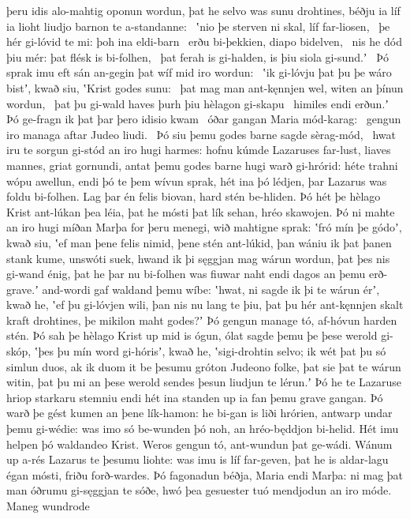 þeru idis alo-mahtig oponun wordun,
þat he selvo was sunu drohtines,
béðju ia líf ia lioht liudjo barnon
te a-standanne: \hld\ ʽnio þe sterven ni skal,
líf far-liosen, \hld\ þe hér gi-lóvid te mi:
þoh ina eldi-barn \hld\ erðu bi-þekkien,
diapo bidelven, \hld\ nis he dód þiu mér:
þat flésk is bi-folhen, \hld\ þat ferah is gi-halden,
is þiu siola gi-sund.ʼ \hld\ Þó sprak imu eft sán an-gegin
þat wíf mid iro wordun: \hld\ ʽik gi-lóvju þat þu þe wáro bistʼ, kwað siu,
ʽKrist godes sunu: \hld\ þat mag man ant-kęnnjen wel,
witen an þínun wordun, \hld\ þat þu gi-wald haves
þurh þiu hèlagon gi-skapu \hld\ himiles endi erðun.ʼ
Þó ge-fragn ik þat þar þero idisio kwam \hld\ óðar gangan
Maria mód-karag: \hld\ gengun iro managa aftar
Judeo liudi. \hld\ Þó siu þemu godes barne
sagde sèrag-mód, \hld\ hwat iru te sorgun gi-stód
an iro hugi harmes: hofnu kúmde
Lazaruses far-lust, liaves mannes,
griat gornundi, antat þemu godes barne
hugi warð gi-hrórid: héte trahni
wópu awellun, endi þó te þem wívun sprak,
hét ina þó lédjen, þar Lazarus was
foldu bi-folhen. Lag þar én felis biovan,
hard stén be-hliden. Þó hét þe hèlago Krist
ant-lúkan þea léia, þat he mósti þat lík sehan,
hréo skawojen. Þó ni mahte an iro hugi míðan
Marþa for þeru menegi, wið mahtigne sprak:
ʽfró mín þe gódoʼ, kwað siu, ʽef man þene felis nimid,
þene stén ant-lúkid, þan wániu ik þat þanen stank kume,
unswóti suek, hwand ik þi sęggjan mag
wárun wordun, þat þes nis gi-wand énig,
þat he þar nu bi-folhen was fiuwar naht endi dagos
an þemu erð-grave.ʼ and-wordi gaf
waldand þemu wíbe: ʽhwat, ni sagde ik þi te wárun érʼ, kwað he,
ʽef þu gi-lóvjen wili, þan nis nu lang te þiu,
þat þu hér ant-kęnnjen skalt kraft drohtines,
þe mikilon maht godes?ʼ Þó gengun manage tó,
af-hóvun harden stén. Þó sah þe hèlago Krist
up mid is ógun, ólat sagde
þemu þe þese werold gi-skóp, ʽþes þu mín word gi-hórisʼ, kwað he,
ʽsigi-drohtin selvo; ik wét þat þu só simlun duos,
ak ik duom it be þesumu gróton Judeono folke,
þat sie þat te wárun witin, þat þu mi an þese werold sendes
þesun liudjun te lérun.ʼ Þó he te Lazaruse hriop
starkaru stemniu endi hét ina standen up
ia fan þemu grave gangan. Þó warð þe gést kumen
an þene lík-hamon: he bi-gan is liði hrórien,
antwarp undar þemu gi-wédie: was imo só be-wunden þó noh,
an hréo-będdjon bi-helid. Hét imu helpen þó
waldandeo Krist. Weros gengun tó,
ant-wundun þat ge-wádi. Wánum up a-rés
Lazarus te þesumu liohte: was imu is líf far-geven,
þat he is aldar-lagu égan mósti,
friðu forð-wardes. Þó fagonadun béðja,
Maria endi Marþa: ni mag þat man óðrumu
gi-sęggjan te sóðe, hwó þea gesuester tuó
mendjodun an iro móde. Maneg wundrode
